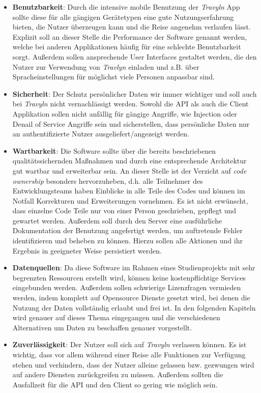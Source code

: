 \begin{itemize}
	\item \textbf{Benutzbarkeit}: Durch die intensive mobile Benutzung der \textit{Travyln} App sollte diese für alle gängigen Gerätetypen eine gute Nutzungserfahrung bieten, die Nutzer überzeugen kann und die Reise angenehm verlaufen lässt. Explizit soll an dieser Stelle die Performance der Software genannt werden, welche bei anderen Applikationen häufig für eine schlechte Benutzbarkeit sorgt. Außerdem sollen ansprechende User Interfaces gestaltet werden, die den Nutzer zur Verwendung von \textit{Travlyn} einladen und z.B. über Spracheinstellungen für möglichst viele Personen anpassbar sind.
	\item \textbf{Sicherheit}: Der Schutz persönlicher Daten wir immer wichtiger und soll auch bei \textit{Travyln} nicht vernachlässigt werden. Sowohl die API als auch die Client Applikation sollen nicht anfällig für gängige Angriffe, wie Injection oder Denail of Service Angriffe sein und sicherstellen, dass persönliche Daten nur an authentifizierte Nutzer ausgeliefert/angezeigt werden.
	\item \textbf{Wartbarkeit}: Die Software sollte über die bereits beschriebenen qualitätssichernden Maßnahmen und durch eine entsprechende Architektur gut wartbar und erweiterbar sein. An dieser Stelle ist der Verzicht auf \textit{code ownership} besonders hervorzuheben, d.h. alle Teilnehmer des Entwicklungsteams haben Einblicke in alle Teile des Codes und können im Notfall Korrekturen und Erweiterungen vornehmen. Es ist nicht erwünscht, dass einzelne Code Teile nur von einer Person geschrieben, gepflegt und gewartet werden. Außerdem soll durch den Server eine ausführliche Dokumentation der Benutzung angefertigt werden, um auftretende Fehler identifizieren und beheben zu können. Hierzu sollen alle Aktionen und ihr Ergebnis in geeigneter Weise persistiert werden.
	\item \textbf{Datenquellen}: Da diese Software im Rahmen eines Studienprojekts mit sehr begrenzten Ressourcen erstellt wird, können keine kostenpflichtige Services eingebunden werden. Außerdem sollen schwierige Lizenzfragen vermieden werden, indem komplett auf Opensource Dienste gesetzt wird, bei denen die Nutzung der Daten vollständig erlaubt und frei ist. In den folgenden Kapiteln wird genauer auf dieses Thema eingegangen und die verschiedenen Alternativen um Daten zu beschaffen genauer vorgestellt.
	\item \textbf{Zuverlässigkeit}: Der Nutzer soll sich auf \textit{Travyln} verlassen können. Es ist wichtig, dass vor allem während einer Reise alle Funktionen zur Verfügung stehen und verhindern, dass der Nutzer alleine gelassen bzw. gezwungen wird auf andere Diensten zurückgreifen zu müssen.
	Außerdem sollten die Ausfallzeit für die API und den Client so gering wie möglich sein.
\end{itemize} 